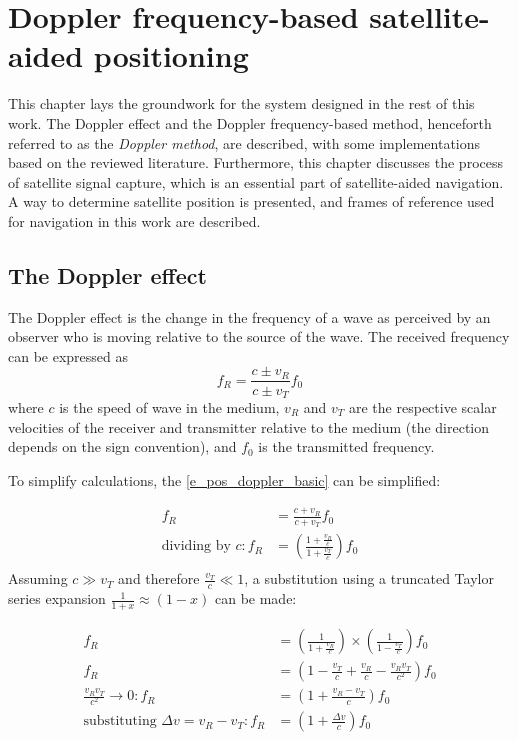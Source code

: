 \chapter{Doppler frequency-based satellite-aided positioning}
\label{s_pos}
This chapter lays the groundwork for the system designed in the rest of this work. The Doppler effect and the Doppler frequency-based method, henceforth referred to as the \textit{Doppler method}, are described, with some implementations based on the reviewed literature. Furthermore, this chapter discusses the process of satellite signal capture, which is an essential part of satellite-aided navigation. A way to determine satellite position is presented, and frames of reference used for navigation in this work are described. 



\section{The Doppler effect}
The Doppler effect is the change in the frequency of a wave as perceived by an observer who is moving relative to the source of the wave. The received frequency can be expressed as
\begin{equation}
    \label{e_pos_doppler_basic}
    f_R = \frac{c \pm v_R}{c \pm v_T} f_0
\end{equation}
 where $c$ is the speed of wave in the medium, $v_R$ and $v_T$ are the respective scalar velocities of the receiver and transmitter relative to the medium (the direction depends on the sign convention), and $f_0$ is the transmitted frequency. 

To simplify calculations, the \autoref{e_pos_doppler_basic} can be simplified:

\begin{align*}
    f_R &= \frac{c + v_R}{c + v_T} f_0 \\
    \text{dividing by } c: f_R & = (\frac{1 + \frac{v_R}{c}}{1 + \frac{v_T}{c}}) f_0 \\
\end{align*}
Assuming $c \gg v_T$ and therefore $\frac{v_T}{c} \ll 1$, a substitution using a truncated Taylor series expansion $\frac{1}{1 + x} \approx (1 - x)$ can be made:

\begin{align}
    f_R &= \left( \frac{1}{1 + \frac{v_R}{c}} \right) \times \left( \frac{1}{1 - \frac{v_T}{c}} \right) f_0 \nonumber \\
    f_R &= \left( 1 - \frac{v_T}{c} + \frac{v_R}{c} - \frac{v_R v_T}{c^2} \right) f_0 \nonumber \\
    \frac{v_R v_T}{c^2} \rightarrow 0: f_R &= \left( 1 + \frac{v_R - v_T}{c} \right) f_0 \nonumber \\
    \text{substituting } \Delta v = v_R - v_T: f_R &= \left( 1 + \frac{\Delta v}{c} \right) f_0 \label{e_pos_dopp_fr}
\end{align}

